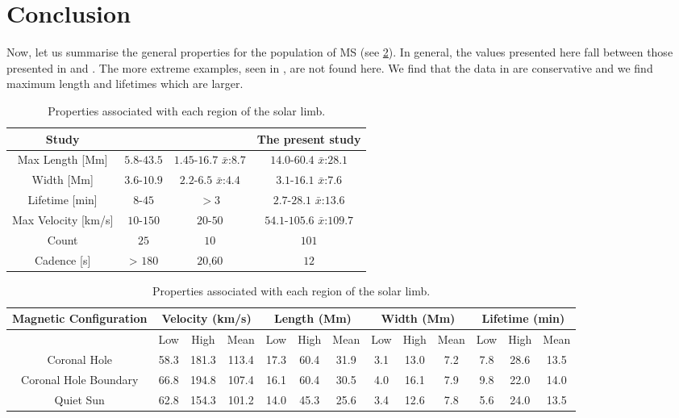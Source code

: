 \section{Conclusion}
\label{sec:conc1}
Now, let us summarise the general properties for the population of MS (see \cref{table:final-properties}). In general, the values presented here fall between those presented in \cite{Bohlin1975} and \cite{Dere89}. The more extreme examples, seen in \cite{Bohlin1975}, are not found here. We find that the data in \cite{Dere89} are conservative and we find maximum length and lifetimes which are larger. 


\begin{table}
	\centering
	\begin{tabular}{c c c c}
		\hline\hline
		Study & \cite{Bohlin1975} & \cite{Dere89} & The present study \\    
		\hline                                
		Max Length [Mm] & $5.8$-$43.5$ & $1.45$-$16.7$ $\bar{x}$:$8.7$ & $14.0$-$60.4$ $\bar{x}$:$28.1$ \\
		Width [Mm] & $3.6$-$10.9$ & $2.2$-$6.5$ $\bar{x}$:$4.4$ & $3.1$-$16.1$ $\bar{x}$:$7.6$ \\
		Lifetime [min] & $8$-$45$ & $> 3$ & $2.7$-$28.1$ $\bar{x}$:$13.6$ \\
		Max Velocity [km/s] & $10$-$150$ & $20$-$50$ & $54.1$-$105.6$ $\bar{x}$:$109.7$ \\
		Count & $25$ & $10$ & $101$ \\
		Cadence [s] & > $180$ & $20$,$60$ & $12$ \\
		\hline 
	\end{tabular}
	\caption{General properties table. Comparing the values given by \cite{Bohlin1975}, \cite{Dere89} and this study.}
	\bigskip\bigskip

	\begin{tabular}{|c|c|c|c|c|c|c|c|c|c|c|c|c|}
				\hline 
				Magnetic Configuration & \multicolumn{3}{c|}{Velocity (km/s)} & \multicolumn{3}{c|}{Length (Mm)} & \multicolumn{3}{c|}{Width (Mm)} & \multicolumn{3}{c|}{Lifetime (min)}\tabularnewline
				\hline 
				\hline 
				& \multicolumn{1}{c|}{Low} & High & Mean & Low & High & Mean & \multicolumn{1}{c|}{Low} & High & Mean & Low & High & Mean\tabularnewline
				\hline 
				Coronal Hole & 58.3 & 181.3 & 113.4 & 17.3 & 60.4 & 31.9 & 3.1 & 13.0 & 7.2 & 7.8 & 28.6 & 13.5\tabularnewline
				\hline 
				Coronal Hole Boundary & 66.8 & 194.8 & 107.4 & 16.1 & 60.4 & 30.5 & 4.0 & 16.1 & 7.9 & 9.8 & 22.0 & 14.0\tabularnewline
				\hline 
				Quiet Sun & 62.8 & 154.3 & 101.2 & 14.0 & 45.3 & 25.6 & 3.4 & 12.6 & 7.8 & 5.6 & 24.0 & 13.5\tabularnewline
				\hline 
	\end{tabular}
	\caption{Properties associated with each region of the solar limb.}
	\label{table:final-properties}
	
\end{table}


